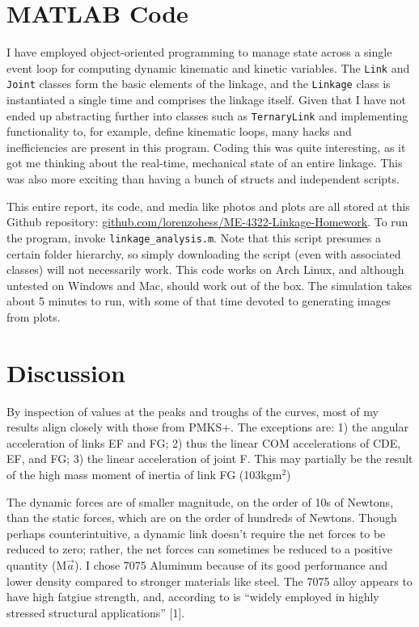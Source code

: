 \documentclass[12pt]{article}
\begin{document}
\section{MATLAB Code}%
\label{code}

I have employed object-oriented programming to manage state across a single event loop for computing dynamic kinematic and kinetic variables. The \texttt{Link} and \texttt{Joint} classes form the basic elements of the linkage, and the \texttt{Linkage} class is instantiated a single time and comprises the linkage itself. Given that I have not ended up abstracting further into classes such as \texttt{TernaryLink} and implementing functionality to, for example, define kinematic loops, many hacks and inefficiencies are present in this program. Coding this was quite interesting, as it got me thinking about the real-time, mechanical state of an entire linkage. This was also more exciting than having a bunch of structs and independent scripts.

This entire report, its code, and media like photos and plots are all stored at this Github repository: \href{https://github.com/lorenzohess/ME-4322-Linkage-Homework}{github.com/lorenzohess/ME-4322-Linkage-Homework}. To run the program, invoke \texttt{linkage\_analysis.m}. Note that this script presumes a certain folder hierarchy, so simply downloading the script (even with associated classes) will not necessarily work. This code works on Arch Linux, and although untested on Windows and Mac, should work out of the box. The simulation takes about 5 minutes to run, with some of that time devoted to generating images from plots.

\section{Discussion}%
\label{discuss}

By inspection of values at the peaks and troughs of the curves, most of my results align closely with those from PMKS+. The exceptions are: 1) the angular acceleration of links EF and FG; 2) thus the linear COM accelerations of CDE, EF, and FG; 3) the linear acceleration of joint F. This may partially be the result of the high mass moment of inertia of link FG (103kgm$^{2}$)

The dynamic forces are of smaller magnitude, on the order of 10s of Newtons, than the static forces, which are on the order of hundreds of Newtons. Though perhaps counterintuitive, a dynamic link doesn't require the net forces to be reduced to zero; rather, the net forces can sometimes be reduced to a positive quantity (M$\vec{a}$). I chose 7075 Aluminum because of its good performance and lower density compared to stronger materials like steel. The 7075 alloy appears to have high fatgiue strength, and, according to is ``widely employed in highly stressed structural applications'' [1].
\end{document}
